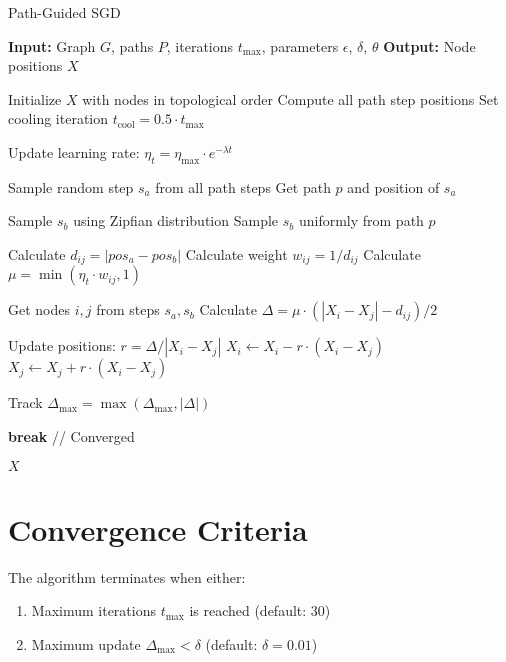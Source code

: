 \documentclass{article}
\begin{document}
\begin{algorithm}
\caption{Path-Guided SGD}
\begin{algorithmic}[1]
\STATE \textbf{Input:} Graph $G$, paths $P$, iterations $t_{\max}$, parameters $\epsilon$, $\delta$, $\theta$
\STATE \textbf{Output:} Node positions $X$

\STATE Initialize $X$ with nodes in topological order
\STATE Compute all path step positions
\STATE Set cooling iteration $t_{\text{cool}} = 0.5 \cdot t_{\max}$

    \STATE Update learning rate: $\eta_t = \eta_{\max} \cdot e^{-\lambda t}$

        \STATE Sample random step $s_a$ from all path steps
        \STATE Get path $p$ and position of $s_a$

            \STATE Sample $s_b$ using Zipfian distribution
        \ELSE
            \STATE Sample $s_b$ uniformly from path $p$
        \ENDIF

        \STATE Calculate $d_{ij} = |pos_a - pos_b|$
        \STATE Calculate weight $w_{ij} = 1/d_{ij}$
        \STATE Calculate $\mu = \min(\eta_t \cdot w_{ij}, 1)$

        \STATE Get nodes $i, j$ from steps $s_a, s_b$
        \STATE Calculate $\Delta = \mu \cdot (|X_i - X_j| - d_{ij})/2$

        \STATE Update positions:
        \STATE $r = \Delta / |X_i - X_j|$
        \STATE $X_i \leftarrow X_i - r \cdot (X_i - X_j)$
        \STATE $X_j \leftarrow X_j + r \cdot (X_i - X_j)$

        \STATE Track $\Delta_{\max} = \max(\Delta_{\max}, |\Delta|)$
    \ENDWHILE

    \IF{$\Delta_{\max} < \delta$}
        \STATE \textbf{break} // Converged
    \ENDIF
\ENDFOR

\RETURN $X$
\end{algorithmic}
\end{algorithm}

\section{Convergence Criteria}

The algorithm terminates when either:
\begin{enumerate}
    \item Maximum iterations $t_{\max}$ is reached (default: 30)
    \item Maximum update $\Delta_{\max} < \delta$ (default: $\delta = 0.01$)
\end{enumerate}
\end{document}
